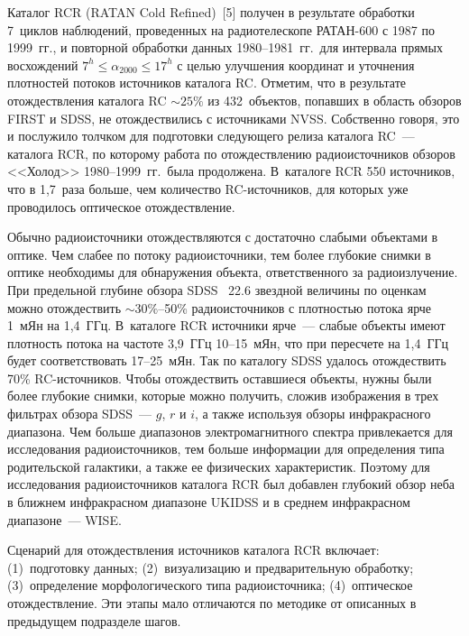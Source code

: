 \begin{multicols}{2}
      Каталог RCR (RATAN Cold Refined)~[5] получен в результате обработки 
7~циклов наблюдений, проведенных на радиотелескопе РАТАН-600 с 1987 по 1999~гг., и 
повторной обработки данных 1980--1981~гг.\ для интервала прямых восхождений $7^h \leq 
\alpha_{2000}\leq 17^h$ с целью улучшения координат и уточнения плотностей потоков 
источников каталога RC. Отметим, что в результате отождествления каталога RC 
$\sim25\%$ из 432~объектов, попавших в область обзоров FIRST и SDSS, не 
отождествились с источниками NVSS. Собственно говоря, это и послужило толчком для 
подготовки следующего релиза каталога RC~--- каталога RCR, по которому работа по 
отождествлению радиоисточников обзоров <<Холод>> 1980--1999~гг.\ была продолжена. 
В~каталоге RCR 550 источников, что в 1,7~раза больше, чем количество RC-ис\-точ\-ни\-ков, 
для которых уже проводилось оптическое отождествление.
      
      Обычно радиоисточники отождествляются с доста\-точ\-но слабыми объектами в оптике. 
Чем слабее по потоку радиоисточники, тем более глубокие снимки в оптике необходимы для 
обнаружения объекта, ответственного за радиоизлучение. При предельной глубине обзора 
SDSS ~22.6 звездной величины по оценкам можно отождествить $\sim30\%$--50\% 
радиоисточников с плотностью потока ярче 1~мЯн на 1,4~ГГц. В~каталоге RCR источники 
ярче~--- слабые объекты имеют плотность потока на частоте 3,9~ГГц 10--15~мЯн, что при 
пересчете на 1,4~ГГц будет соответствовать 17--25~мЯн. Так по каталогу SDSS удалось 
отождествить 70\% RC-ис\-точ\-ни\-ков. Чтобы отождествить оставшиеся объекты, нужны 
были более глубокие снимки, которые можно получить, сложив изображения в трех 
фильтрах обзора SDSS~--- $g$, $r$ и $i$, а также используя обзоры инфракрасного 
диапазона. Чем больше диапазонов электромагнитного спектра привлекается для 
исследования радиоисточников, тем больше информации для определения типа 
родительской галактики, а также ее физических характеристик. Поэтому для исследования 
радиоисточников каталога RCR был добавлен глубокий обзор неба в ближнем 
инфракрасном диапазоне UKIDSS и в среднем инфракрасном диапазоне~--- WISE. 
      
      Сценарий для отождествления источников каталога RCR включает: (1)~подготовку 
данных; (2)~визуализацию и предварительную обработку; (3)~определение морфологического 
типа радиоисточника; (4)~оптическое отождествление. Эти этапы мало отличаются по 
методике от описанных в предыдущем подразделе шагов. 

      \begin{table*}[b]\small
      \begin{center}
      \vspace*{2ex}
      

\end{center}
\end{table*}
\end{multicols}
